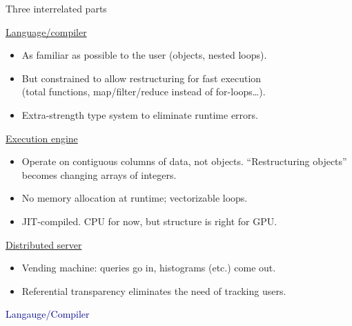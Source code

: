 \documentclass{beamer}
\begin{document}
\begin{frame}{Three interrelated parts}
\vspace{0.15 cm}
\begin{block}{\underline{Language/compiler}}
\vspace{-0.1 cm}
\begin{itemize}
\item As familiar as possible to the user (objects, nested loops).
\item But constrained to allow restructuring for fast execution \\ (total functions, map/filter/reduce instead of for-loops\ldots).
\item Extra-strength type system to eliminate runtime errors.
\end{itemize}
\end{block}

\vspace{-0.2 cm}
\begin{block}{\underline{Execution engine}}
\vspace{-0.1 cm}
\begin{itemize}
\item Operate on contiguous columns of data, not objects. ``Restructuring objects'' becomes changing arrays of integers.
\item No memory allocation at runtime; vectorizable loops.
\item JIT-compiled. CPU for now, but structure is right for GPU.
\end{itemize}
\end{block}

\vspace{-0.2 cm}
\begin{block}{\underline{Distributed server}}
\vspace{-0.1 cm}
\begin{itemize}
\item Vending machine: queries go in, histograms (etc.) come out.
\item Referential transparency eliminates the need of tracking users.
\end{itemize}
\end{block}
\end{frame}

\begin{frame}{}
\begin{center}
\LARGE \textcolor{darkblue}{Langauge/Compiler}
\end{center}
\end{frame}
\end{document}
